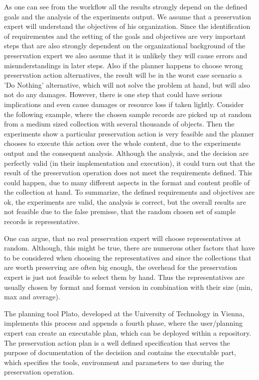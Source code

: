 As one can see from the workflow all the results strongly depend on the defined goals and the analysis of the experiments output. We assume that a preservation expert will understand the objectives of his organization. Since the identification of requirementes and the setting of the goals and objectives are very important steps that are also strongly dependent on the organizational background of the preservation expert we also assume that it is unlikely they will cause errors and misunderstandings in later steps. Also if the planner happens to choose wrong preservation action alternatives, the result will be in the worst case scenario a 'Do Nothing' alternative, which will not solve the problem at hand, but will also not do any damages.
However, there is one step that could have serious implications and even cause damages or resource loss if taken lightly. Consider the following example, where the chosen sample records are picked up at random from a medium sized collection with several thousands of objects. Then the experiments show a particular preservation action is very feasible and the planner chooses to execute this action over the whole content, due to the experiments output and the consequent analysis. Although the analysis, and the decision are perfectly valid (in their implementation and execution), it could turn out that the result of the preservation operation does not meet the requirements defined. This could happen, due to many different aspects in the format and content profile of the collection at hand. To summarize, the defined requirements and objectives are ok, the experiments are valid, the analysis is correct, but the overall results are not feasible due to the false premisse, that the random chosen set of sample records is representative.

One can argue, that no real preservation expert will choose representatives at random. Although, this might be true, there are numerous other factors that have to be considered when choosing the representatives and since the collections that are worth preserving are often big enough, the overhead for the preservation expert is just not feasible to select them by hand. Thus the representatives are usually chosen by format and format version in combination with their size (min, max and average).

The planning tool Plato, developed at the University of Technology in Vienna, implements this process and appends a fourth phase, where the user/planning expert can create an executable plan, which can be deployed within a repository. The preservation action plan is a well defined specification that serves the purpose of documentation of the decisiion and contains the executable part, which specifies the tools, environment and parameters to use during the preservation operation.

